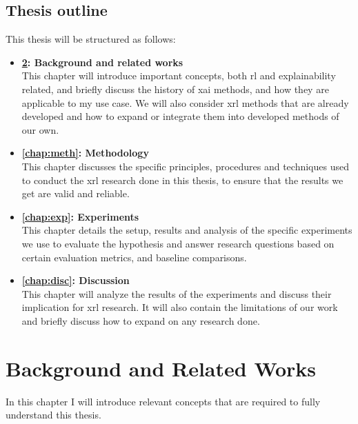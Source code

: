 \documentclass[UKenglish]{uiomasterthesis}
\begin{document}
\section{Thesis outline}
This thesis will be structured as follows:
\begin{itemize}

    \item \textbf{\cref{chap:background}: Background and related works}\\
        This chapter will introduce important concepts, both \ac{rl} and explainability related, and briefly discuss the history of \ac{xai} methods, and how they are applicable to my use case. We will also consider \ac{xrl} methods that are already developed and how to expand or integrate them into developed methods of our own.

    \item \textbf{\cref{chap:meth}: Methodology}\\
        This chapter discusses the specific principles, procedures and techniques used to conduct the \ac{xrl} research done in this thesis, to ensure that the results we get are valid and reliable.

    \item \textbf{\cref{chap:exp}: Experiments}\\
        This chapter details the setup, results and analysis of the specific experiments we use to evaluate the hypothesis and answer research questions based on certain evaluation metrics, and baseline comparisons.

    \item \textbf{\cref{chap:disc}: Discussion}\\
        This chapter will analyze the results of the experiments and discuss their implication for \ac{xrl} research. It will also contain the limitations of our work and briefly discuss how to expand on any research done.
\end{itemize}


\chapter{Background and Related Works}
\label{chap:background}
In this chapter I will introduce relevant concepts that are required to fully understand this thesis.
\end{document}
